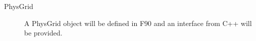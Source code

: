 %


\begin{description}

\item [PhysGrid] A PhysGrid object will be defined in F90 and an interface
from C++ will be provided.

\end{description}







